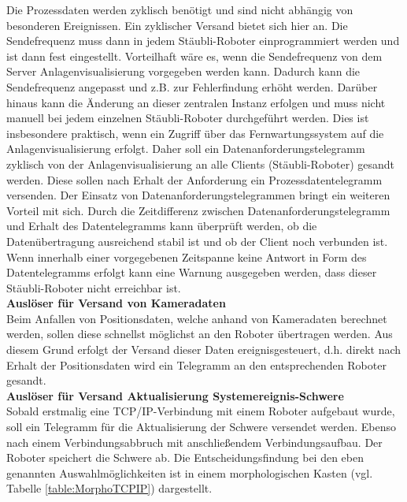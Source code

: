 \documentclass[ a4paper,
                oneside,
                toc=bibliography,
                toc=listof
                ]{scrbook}
\begin{document}
	Die Prozessdaten werden zyklisch benötigt und sind nicht abhängig von besonderen Ereignissen. Ein zyklischer Versand bietet sich hier an. Die Sendefrequenz muss dann in jedem Stäubli-Roboter einprogrammiert werden und ist dann fest eingestellt. Vorteilhaft wäre es, wenn die Sendefrequenz von dem Server Anlagenvisualisierung vorgegeben werden kann. Dadurch kann die Sendefrequenz angepasst und z.B. zur Fehlerfindung erhöht werden. Darüber hinaus kann die Änderung an dieser zentralen Instanz erfolgen und muss nicht manuell bei jedem einzelnen Stäubli-Roboter durchgeführt werden. Dies ist insbesondere praktisch, wenn ein Zugriff über das Fernwartungssystem auf die Anlagenvisualisierung erfolgt. Daher soll ein Datenanforderungstelegramm zyklisch von der Anlagenvisualisierung an alle Clients (Stäubli-Roboter) gesandt werden. Diese sollen nach Erhalt der Anforderung ein Prozessdatentelegramm versenden. Der Einsatz von Datenanforderungstelegrammen bringt ein weiteren Vorteil mit sich. Durch die Zeitdifferenz zwischen Datenanforderungstelegramm und Erhalt des Datentelegramms kann überprüft werden, ob die Datenübertragung ausreichend stabil ist und ob der Client noch verbunden ist. Wenn innerhalb einer vorgegebenen Zeitspanne keine Antwort in Form des Datentelegramms erfolgt kann eine Warnung ausgegeben werden, dass dieser Stäubli-Roboter nicht erreichbar ist.\vspace{0.5\baselineskip}\\
	\textbf{Auslöser für Versand von Kameradaten} \\
	Beim Anfallen von Positionsdaten, welche anhand von Kameradaten berechnet werden, sollen diese schnellst möglichst an den Roboter übertragen werden. Aus diesem Grund erfolgt der Versand dieser Daten ereignisgesteuert, d.h. direkt nach Erhalt der Positionsdaten wird ein Telegramm an den entsprechenden Roboter gesandt.\vspace{0.5\baselineskip}\\
	\noindent
	\textbf{Auslöser für Versand Aktualisierung Systemereignis-Schwere} \\
	Sobald erstmalig eine TCP/IP-Verbindung mit einem Roboter aufgebaut wurde, soll ein Telegramm für die Aktualisierung der Schwere versendet werden. Ebenso nach einem Verbindungsabbruch mit anschließendem Verbindungsaufbau. Der Roboter speichert die Schwere ab.
	\newline
	Die Entscheidungsfindung bei den eben genannten Auswahlmöglichkeiten ist in einem morphologischen Kasten (vgl. Tabelle \ref{table:MorphoTCPIP}) dargestellt. \vspace{-5pt}
	
\end{document}
